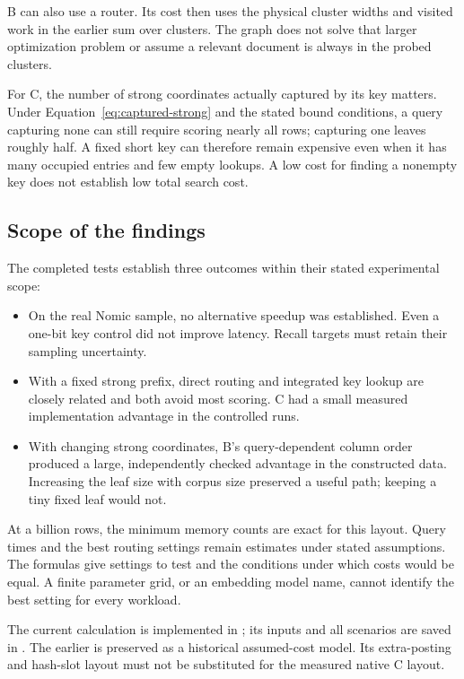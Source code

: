 
B can also use a router. Its cost then uses the physical cluster widths and visited
work in the earlier sum over clusters. The graph does not solve that larger optimization
problem or assume a relevant document is always in the probed clusters.

For C, the number of strong coordinates actually captured by its key matters. Under
Equation~\eqref{eq:captured-strong} and the stated bound conditions, a query capturing none
can still require scoring nearly all rows; capturing one leaves roughly half. A fixed short
key can therefore remain expensive even when it has many occupied entries and few empty
lookups. A low cost for finding a nonempty key does not establish low total search cost.

\subsection{Scope of the findings}
The completed tests establish three outcomes within their stated experimental scope:
\begin{itemize}
\item On the real Nomic sample, no alternative speedup was established. Even a one-bit key
control did not improve latency. Recall targets must retain their sampling uncertainty.
\item With a fixed strong prefix, direct routing and integrated key lookup are closely related
and both avoid most scoring. C had a small measured implementation advantage in the controlled runs.
\item With changing strong coordinates, B's query-dependent column order produced a large,
independently checked advantage in the constructed data. Increasing the leaf size with corpus
size preserved a useful path; keeping a tiny fixed leaf would not.
\end{itemize}
At a billion rows, the minimum memory counts are exact for this layout. Query times and
the best routing settings remain estimates under stated assumptions. The formulas give
settings to test and the conditions under which costs would be equal. A finite parameter
grid, or an embedding model name, cannot identify the best setting for every workload.

The current calculation is implemented in ; its inputs and all scenarios
are saved in . The earlier
 is preserved as a historical assumed-cost
model. Its extra-posting and hash-slot layout must not be substituted for the measured native C layout.

